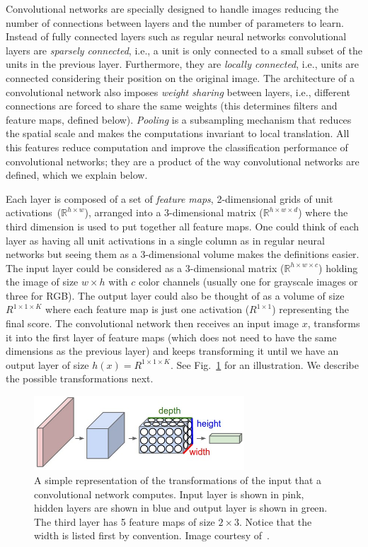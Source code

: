 Convolutional networks are specially designed to handle images reducing the number of connections between layers and the number of parameters to learn. Instead of fully connected layers such as regular neural networks convolutional layers are \emph{sparsely connected}, i.e., a unit is only connected to a small subset of the units in the previous layer. Furthermore, they are \emph{locally connected}, i.e., units are connected considering their position on the original image. The architecture of a convolutional network also imposes \emph{weight sharing} between layers, i.e., different connections are forced to share the same weights (this determines filters and feature maps, defined below). \emph{Pooling} is a subsampling mechanism that reduces the spatial scale and makes the computations invariant to local translation. All this features reduce computation and improve the classification performance of convolutional networks; they are a product of the way convolutional networks are defined, which we explain below.

Each layer is composed of a set of \emph{feature maps}, 2-dimensional grids of unit activations~($\mathbb{R}^{h\times w}$), arranged into a 3-dimensional matrix ($\mathbb{R}^{h\times w \times d}$) where the third dimension is used to put together all feature maps. One could think of each layer as having all unit activations in a single column as in regular neural networks but seeing them as a 3-dimensional volume makes the definitions easier. The input layer could be considered as a 3-dimensional matrix ($\mathbb{R}^{h\times w \times c}$) holding the image of size $w\times h$ with $c$ color channels (usually one for grayscale images or three for RGB). The output layer could also be thought of as a volume of size $R^{1\times 1 \times K}$ where each feature map is just one activation ($R^{1\times 1}$) representing the final score. The convolutional network then receives an input image $x$, transforms it into the first layer of feature maps (which does not need to have the same dimensions as the previous layer) and keeps transforming it until we have an output layer of size $h(x) = R^{1\times 1 \times K}$. See Fig.~\ref{fig:ConvNetVolumes} for an illustration. We describe the possible transformations next.
\begin{figure}[h]
	\centering
	\includegraphics[width = 0.7\textwidth]{plots/convNetVolumes.jpeg}
	\caption[Convolutional network visualization]{A simple representation of the transformations of the input that a convolutional network computes. Input layer is shown in pink, hidden layers are shown in blue and output layer is shown in green. The third layer has 5 feature maps of size $2\times3$. Notice that the width is listed first by convention. Image courtesy of~\cite{Karpathy2015}.}
	\label{fig:ConvNetVolumes}
\end{figure}

